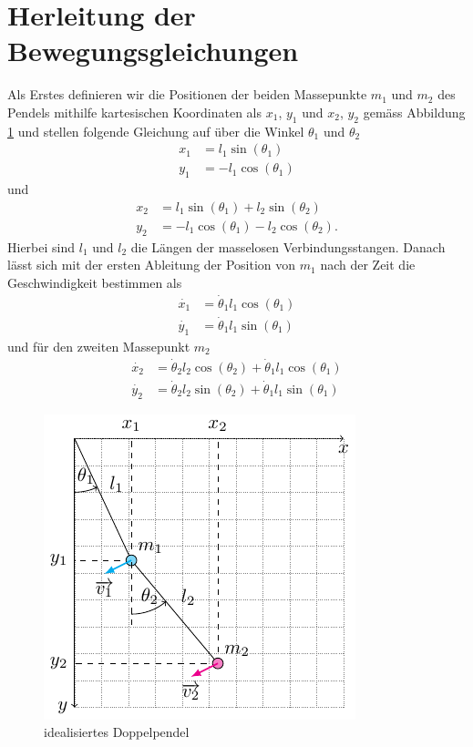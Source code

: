 
\section{Herleitung der Bewegungsgleichungen}
Als Erstes definieren wir die Positionen der beiden Massepunkte 
\(m_1\) und \(m_2\) des Pendels mithilfe kartesischen Koordinaten 
als \(x_1\), \(y_1\) und \(x_2\), \(y_2\) gemäss Abbildung \ref{fig:pendulum} 
und stellen folgende Gleichung auf über die Winkel \(\theta_1\) und \(\theta_2\)
\begin{align}
    x_1 &= l_1 \sin(\theta_1)\\
    y_1 &= -l_1 \cos(\theta_1)
\end{align}
und
\begin{align}
    x_2 &= l_1 \sin(\theta_1) + l_2 \sin(\theta_2) \\
    y_2 &= -l_1 \cos(\theta_1) - l_2 \cos(\theta_2).  
\end{align}
Hierbei sind \(l_1\) und \(l_2\) die Längen der masselosen Verbindungsstangen.
Danach lässt sich mit der ersten Ableitung der Position von
\(m_1\) nach der Zeit die Geschwindigkeit bestimmen als
\begin{align}
    \dot{x_1} &= \dot{\theta}_1 l_1 \cos(\theta_1) \\
    \dot{y_1} &= \dot{\theta}_1 l_1 \sin(\theta_1) 
\end{align}
und für den zweiten Massepunkt \(m_2\) 
\begin{align}
    \dot{x_2} &= \dot{\theta}_2 l_2 \cos(\theta_2) 
    + \dot{\theta}_1 l_1 \cos(\theta_1) \\
    \dot{y_2} &= \dot{\theta}_2 l_2 \sin(\theta_2) 
    + \dot{\theta}_1 l_1 \sin(\theta_1)  
\end{align}

\begin{figure}
    \centering
    \includegraphics{pendel_pic.pdf}
    \caption{idealisiertes Doppelpendel}
    \label{fig:pendulum}
\end{figure}

